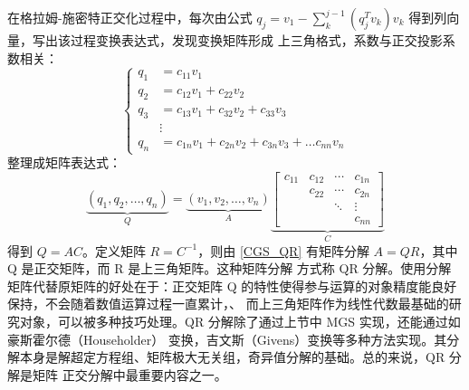 在格拉姆-施密特正交化过程中，每次由公式 $q_j=v_1-\sum_k^{j-1}(q_j^Tv_k)v_k$ 得到列向量，写出该过程变换表达式，发现变换矩阵形成
上三角格式，系数与正交投影系数相关：
\begin{equation}
    \begin{cases}
        q_1 & =c_{11}v_1                                     \\
        q_2 & =c_{12}v_1+c_{22}v_2                           \\
        q_3 & =c_{13}v_1+c_{32}v_2+c_{33}v_3                 \\
            & \vdots                                         \\
        q_n & =c_{1n}v_1+c_{2n}v_2+c_{3n}v_3+\dots c_{nn}v_n
    \end{cases}
\end{equation}
整理成矩阵表达式：
\begin{equation}
    \label{CGS_QR}
    \underbrace{\left(q_1,q_2,\dots,q_n\right)}_Q=\underbrace{\left(v_1,v_2,\dots,v_n\right)}_A
    \underbrace{
        \begin{bmatrix}
            c_{11} & c_{12} & \cdots & c_{1n} \\
                   & c_{22} & \cdots & c_{2n} \\
                   &        & \ddots & \vdots \\
                   &
                   &        & c_{nn}
        \end{bmatrix}
    }_C
\end{equation}
得到 $Q=AC$。定义矩阵 $R=C^{-1}$，则由 \eqref{CGS_QR} 有矩阵分解 $A=QR$，其中 Q 是正交矩阵，而 R 是上三角矩阵。这种矩阵分解
方式称 QR 分解。使用分解矩阵代替原矩阵的好处在于：正交矩阵 Q 的特性使得参与运算的对象精度能良好保持，不会随着数值运算过程一直累计，、
而上三角矩阵作为线性代数最基础的研究对象，可以被多种技巧处理。QR 分解除了通过上节中 MGS 实现，还能通过如豪斯霍尔德（Householder）
变换，吉文斯（Givens）变换等多种方法实现。其分解本身是解超定方程组、矩阵极大无关组，奇异值分解的基础。总的来说，QR 分解是矩阵
正交分解中最重要内容之一。

